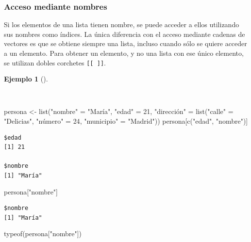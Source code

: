 \documentclass[
  a4paper,
]{scrreport}
\newenvironment{Shaded}{\begin{snugshade}}{\end{snugshade}}
\newcommand{\DecValTok}[1]{\textcolor[rgb]{0.68,0.00,0.00}{#1}}
\newcommand{\FunctionTok}[1]{\textcolor[rgb]{0.28,0.35,0.67}{#1}}
\newcommand{\NormalTok}[1]{\textcolor[rgb]{0.00,0.23,0.31}{#1}}
\newcommand{\OtherTok}[1]{\textcolor[rgb]{0.00,0.23,0.31}{#1}}
\newcommand{\StringTok}[1]{\textcolor[rgb]{0.13,0.47,0.30}{#1}}
\theoremstyle{definition}
\theoremstyle{definition}
\newtheorem{example}{Ejemplo}[chapter]
\theoremstyle{remark}
\begin{document}
\hypertarget{acceso-mediante-nombres}{%
\subsubsection{Acceso mediante nombres}\label{acceso-mediante-nombres}}

Si los elementos de una lista tienen nombre, se puede acceder a ellos
utilizando sus nombres como índices. La única diferencia con el acceso
mediante cadenas de vectores es que se obtiene siempre una lista,
incluso cuando sólo se quiere acceder a un elemento. Para obtener un
elemento, y no una lista con ese único elemento, se utilizan dobles
corchetes \texttt{{[}{[}\ {]}{]}}.

\begin{example}[]\protect\hypertarget{exm-acceso-listas-nombres}{}\label{exm-acceso-listas-nombres}

~

\begin{Shaded}
\begin{Highlighting}[]
\NormalTok{persona }\OtherTok{\textless{}{-}} \FunctionTok{list}\NormalTok{(}\StringTok{"nombre"} \OtherTok{=} \StringTok{"María"}\NormalTok{, }\StringTok{"edad"} \OtherTok{=} \DecValTok{21}\NormalTok{, }\StringTok{"dirección"} \OtherTok{=} \FunctionTok{list}\NormalTok{(}\StringTok{"calle"} \OtherTok{=} \StringTok{"Delicias"}\NormalTok{, }\StringTok{"número"} \OtherTok{=} \DecValTok{24}\NormalTok{, }\StringTok{"municipio"} \OtherTok{=} \StringTok{"Madrid"}\NormalTok{))}
\NormalTok{persona[}\FunctionTok{c}\NormalTok{(}\StringTok{"edad"}\NormalTok{, }\StringTok{"nombre"}\NormalTok{)]}
\end{Highlighting}
\end{Shaded}

\begin{verbatim}
$edad
[1] 21

$nombre
[1] "María"
\end{verbatim}

\begin{Shaded}
\begin{Highlighting}[]
\NormalTok{persona[}\StringTok{"nombre"}\NormalTok{]}
\end{Highlighting}
\end{Shaded}

\begin{verbatim}
$nombre
[1] "María"
\end{verbatim}

\begin{Shaded}
\begin{Highlighting}[]
\FunctionTok{typeof}\NormalTok{(persona[}\StringTok{"nombre"}\NormalTok{])}
\end{Highlighting}
\end{Shaded}


\end{example}
\end{document}
